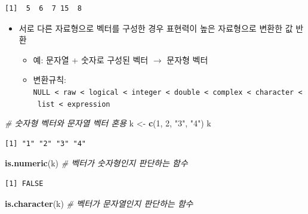 \documentclass[
  11pt,
]{krantz}
\newenvironment{Shaded}{\begin{snugshade}}{\end{snugshade}}
\newcommand{\CommentTok}[1]{\textcolor[rgb]{0.37,0.37,0.37}{\textit{#1}}}
\newcommand{\DecValTok}[1]{\textcolor[rgb]{0.06,0.06,0.06}{#1}}
\newcommand{\KeywordTok}[1]{\textcolor[rgb]{0.27,0.27,0.27}{\textbf{#1}}}
\newcommand{\NormalTok}[1]{#1}
\newcommand{\StringTok}[1]{\textcolor[rgb]{0.5,0.5,0.5}{#1}}
\providecommand{\tightlist}{%
  \setlength{\itemsep}{0pt}\setlength{\parskip}{0pt}}
\begin{document}
\begin{verbatim}
[1]  5  6  7 15  8
\end{verbatim}

\normalsize

\begin{itemize}
\tightlist
\item
  서로 다른 자료형으로 벡터를 구성한 경우 표현력이 높은 자료형으로 변환한 값 반환

  \begin{itemize}
  \tightlist
  \item
    예: 문자열 + 숫자로 구성된 벡터 \(\rightarrow\) 문자형 벡터
  \item
    변환규칙: \texttt{NULL\ \textless{}\ raw\ \textless{}\ logical\ \textless{}\ integer\ \textless{}\ double\ \textless{}\ complex\ \textless{}\ character\ \textless{}\ list\ \textless{}\ expression}
  \end{itemize}
\end{itemize}

\footnotesize

\begin{Shaded}
\begin{Highlighting}[]
\CommentTok{# 숫자형 벡터와 문자열 벡터 혼용}
\NormalTok{k <-}\StringTok{ }\KeywordTok{c}\NormalTok{(}\DecValTok{1}\NormalTok{, }\DecValTok{2}\NormalTok{, }\StringTok{"3"}\NormalTok{, }\StringTok{"4"}\NormalTok{)}
\NormalTok{k}
\end{Highlighting}
\end{Shaded}

\begin{verbatim}
[1] "1" "2" "3" "4"
\end{verbatim}

\begin{Shaded}
\begin{Highlighting}[]
\KeywordTok{is.numeric}\NormalTok{(k) }\CommentTok{# 벡터가 숫자형인지 판단하는 함수}
\end{Highlighting}
\end{Shaded}

\begin{verbatim}
[1] FALSE
\end{verbatim}

\begin{Shaded}
\begin{Highlighting}[]
\KeywordTok{is.character}\NormalTok{(k) }\CommentTok{# 벡터가 문자열인지 판단하는 함수}
\end{Highlighting}
\end{Shaded}
\end{document}
